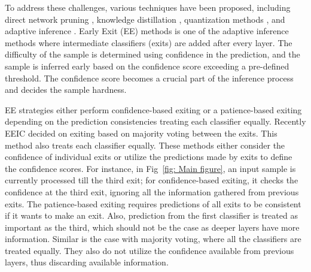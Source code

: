 To address these challenges, various techniques have been proposed, including direct network pruning \citep{zhu2017prune, fan2019reducing,michel2019sixteen}, knowledge distillation \citep{sun2019patient, sanh2019distilbert, jiao2019tinybert}, quantization methods \citep{zhang2020ternarybert, bai2020binarybert, kim2021bert}, and adaptive inference \citep{zhou2020bert, xin2020deebert, geng2021romebert, liu2020fastbert}.
Early Exit (EE) methods \citep{teerapittayanon2016branchynet, zhou2020bert, fei2022deecap} is one of the adaptive inference methods where intermediate classifiers (exits) are added after every layer. The difficulty of the sample is determined using confidence in the prediction, and the sample is inferred early based on the confidence score exceeding a pre-defined threshold. The confidence score becomes a crucial part of the inference process and decides the sample hardness.  


EE strategies either perform confidence-based exiting \citep{xin2020deebert} or a patience-based exiting \citep{zhou2020bert} depending on the prediction consistencies treating each classifier equally. Recently EEIC \citep{sun2021early} decided on exiting based on majority voting between the exits. This method also treats each classifier equally. These methods either consider the confidence of individual exits or utilize the predictions made by exits to define the confidence scores. For instance, in Fig~\ref{fig: Main figure}, an input sample is currently processed till the third exit; for confidence-based exiting, it checks the confidence at the third exit, ignoring all the information gathered from previous exits. The patience-based exiting requires predictions of all exits to be consistent if it wants to make an exit. %
Also, prediction from the first classifier is treated as important as the third, which should not be the case as deeper layers have more information. Similar is the case with majority voting, where all the classifiers are treated equally. They also do not utilize the confidence available from previous layers, thus discarding available information. 

